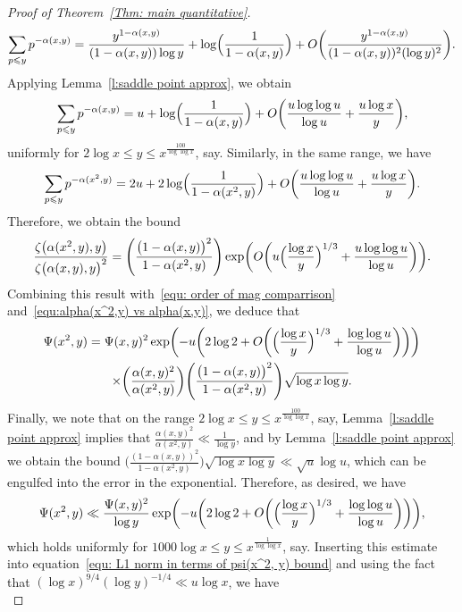 \documentclass[12pt,a4paper,reqno]{amsart}
\numberwithin{equation}{section}
\def\leq {\leqslant}
\theoremstyle{remark}
\theoremstyle{definition}
\numberwithin{equation}{section}
\theoremstyle{remark}
\begin{document}
\begin{proof}[Proof of Theorem~\ref{Thm: main quantitative}]
\[
\sum_{p \leq y} p^{-\alpha (x, y)} = \frac{y^{1 - \alpha(x,y)}}{(1 - \alpha(x,y)) \log y} +  \log \Bigl( \frac{1}{1 - \alpha(x,y)} \Bigr) + O \biggl( \frac{y^{1 - \alpha(x,y)}}{(1 - \alpha(x,y))^2 (\log y)^2} \biggr).
\]
Applying Lemma~\ref{l:saddle point approx}, we obtain
\[
\sum_{p \leq y} p^{-\alpha (x, y)} = u + \log \Bigl( \frac{1}{1 - \alpha(x,y)} \Bigr) + O \biggl( \frac{u \log \log u}{\log u} + \frac{u \log x}{y}\biggr),
\]
uniformly for $2 \log x \leq y \leq x^{\frac{100}{\log \log x}}$, say. Similarly, in the same range, we have 
\[
\sum_{p \leq y} p^{-\alpha (x^2 , y)} = 2u + 2 \log \Bigl( \frac{1}{1 - \alpha(x^2 ,y)} \Bigr) + O \biggl( \frac{u \log \log u}{\log u} + \frac{u \log x}{y}\biggr).
\]
Therefore, we obtain the bound
\[
\frac{\zeta \bigl( \alpha (x^2, y), y \bigr)}{\zeta \bigl( \alpha (x,y), y \bigr)^2} = \Biggl( \frac{\bigl( 1 - \alpha (x,y) \bigr)^2}{1 - \alpha (x^2 ,y)} \Biggr)  \exp \biggl( O \biggl( u \Bigl( \frac{\log x}{y} \Bigr)^{1/3} + \frac{u \log \log u}{\log u} \biggr) \biggr).
\]
Combining this result with~\eqref{equ: order of mag comparrison} and~\eqref{equ:alpha(x^2,y) vs alpha(x,y)}, we deduce that
\begin{multline*}
\Psi (x^2, y) = \Psi(x,y)^2 \exp \biggl( - u \biggl( 2 \log 2 + O \biggl( \Bigl( \frac{\log x}{y} \Bigr)^{1/3} + \frac{\log \log u}{\log u} \biggr) \biggr) \biggr) \\ \times \biggl( \frac{\alpha(x,y)^2}{\alpha(x^2, y)} \biggr) \Biggl( \frac{\bigl( 1 - \alpha (x,y) \bigr)^2}{1 - \alpha (x^2 ,y)} \Biggr) \sqrt{\log x \log y}.
\end{multline*}
Finally, we note that on the range $2 \log x \leq y \leq x^{\frac{100}{\log \log x}}$, say, Lemma~\ref{l:saddle point approx} implies that $\frac{\alpha(x,y)^2}{\alpha(x^2, y)} \ll \frac{1}{\log y}$, and by Lemma~\ref{l:saddle point approx} we obtain the bound $\bigl( \frac{( 1 - \alpha (x,y) )^2}{1 - \alpha (x^2 ,y)} \bigr) \sqrt{\log x \log y} \ll \sqrt{u} \log u$, which can be engulfed into the error in the exponential. Therefore, as desired, we have
\[
\Psi (x^2, y) \ll \frac{\Psi(x,y)^2}{\log y} \exp \biggl( - u \biggl( 2 \log 2 + O \biggl( \Bigl( \frac{\log x}{y} \Bigr)^{1/3} + \frac{\log \log u}{\log u} \biggr) \biggr) \biggr),
\]
which holds uniformly for $1000 \log x \leq y \leq x^{\frac{1}{\log \log x}}$, say. Inserting this estimate into equation~\eqref{equ: L1 norm in terms of psi(x^2, y) bound} and using the fact that $(\log x)^{9/4} (\log y)^{-1/4} \ll u \log x$, we have
\begin{equation}\label{equ: comp to trivial bound}

\end{equation}
\end{proof}
\end{document}
